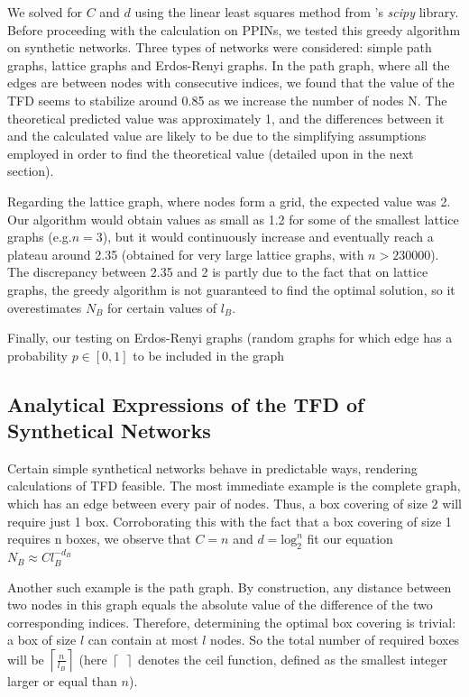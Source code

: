 We solved for $C$ and $d$ using the linear least squares method from \PY's \textit{scipy} library. Before proceeding with the calculation on PPINs, we tested this greedy algorithm on synthetic networks. Three types of networks were considered: simple path graphs, lattice graphs and Erdos-Renyi graphs. In the path graph, where all the edges are between nodes with consecutive indices, we found that the value of the TFD seems to stabilize around 0.85 as we increase the number of nodes N. The theoretical predicted value was approximately 1, and the differences between it and the calculated value are likely to be due to the simplifying assumptions employed in order to find the theoretical value (detailed upon in the next section).

Regarding the lattice graph, where nodes form a grid, the expected value was 2. Our algorithm would obtain values as small as 1.2 for some of the smallest lattice graphs (e.g.$n=3$), but it would continuously increase and eventually reach a plateau around 2.35 (obtained for very large lattice graphs, with $n>230000$). The discrepancy between 2.35 and 2 is partly due to the fact that on lattice graphs, the greedy algorithm is not guaranteed to find the optimal solution, so it overestimates $N_B$ for certain values of $l_B$. 

Finally, our testing on Erdos-Renyi graphs (random graphs for which edge has a probability $p \in [0,1]$ to be included in the graph

\subsection{Analytical Expressions of the TFD of Synthetical Networks}

Certain simple synthetical networks behave in predictable ways, rendering calculations of TFD feasible. The most immediate example is the complete graph, which has an edge between every pair of nodes. Thus, a box covering of size $2$ will require just 1 box. Corroborating this with the fact that a box covering of size 1 requires n boxes, we observe that $C=n$ and $d=\text{log}_2^n$ fit our equation $N_B \approx Cl_B^{-d_{B}}$

Another such example is the path graph. By construction, any distance between two nodes in this graph equals the absolute value of the difference of the two corresponding indices. Therefore, determining the optimal box covering is trivial: a box of size $l$ can contain at most $l$ nodes. So the total number of required boxes will be $\left\lceil \frac{n}{l_B} \right\rceil$ (here $\left\lceil \ \ \right\rceil$ denotes the ceil function, defined as the smallest integer larger or equal than $n$).

